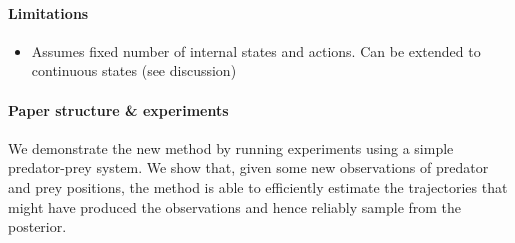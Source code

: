 \paragraph{Limitations}


\begin{itemize}
\item Assumes fixed number of internal states and actions. Can be extended to continuous states (see  discussion)
\end{itemize}

\paragraph{Paper structure \& experiments}

We demonstrate the new method by running experiments using a simple predator-prey system. We show that, given some new observations of predator and prey positions, the method is able to efficiently estimate the trajectories that might have produced the observations and hence reliably sample from the posterior.


